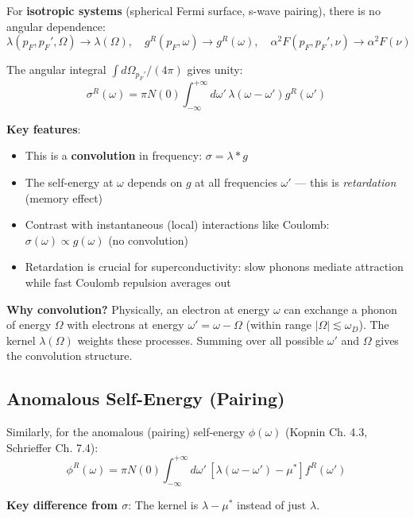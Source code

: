 \documentclass[12pt]{article}
\begin{document}
For \textbf{isotropic systems} (spherical Fermi surface, s-wave pairing), there is no angular dependence:
\begin{equation}
\lambda(p_F, p_F', \Omega) \to \lambda(\Omega), \quad g^R(p_F, \omega) \to g^R(\omega), \quad \alpha^2F(p_F, p_F', \nu) \to \alpha^2F(\nu)
\end{equation}

The angular integral $\int d\Omega_{p_F'}/(4\pi)$ gives unity:
\begin{equation}
\boxed{
\sigma^R(\omega) = \pi N(0) \int_{-\infty}^{+\infty} d\omega' \, \lambda(\omega - \omega') g^R(\omega')
}
\end{equation}

\textbf{Key features}:
\begin{itemize}
\item This is a \textbf{convolution} in frequency: $\sigma = \lambda * g$
\item The self-energy at $\omega$ depends on $g$ at all frequencies $\omega'$ — this is \textit{retardation} (memory effect)
\item Contrast with instantaneous (local) interactions like Coulomb: $\sigma(\omega) \propto g(\omega)$ (no convolution)
\item Retardation is crucial for superconductivity: slow phonons mediate attraction while fast Coulomb repulsion averages out
\end{itemize}

\textbf{Why convolution?} Physically, an electron at energy $\omega$ can exchange a phonon of energy $\Omega$ with electrons at energy $\omega' = \omega - \Omega$ (within range $|\Omega| \lesssim \omega_D$). The kernel $\lambda(\Omega)$ weights these processes. Summing over all possible $\omega'$ and $\Omega$ gives the convolution structure.

\subsection{Anomalous Self-Energy (Pairing)}

Similarly, for the anomalous (pairing) self-energy $\phi(\omega)$ (Kopnin Ch. 4.3, Schrieffer Ch. 7.4):
\begin{equation}
\boxed{
\phi^R(\omega) = \pi N(0) \int_{-\infty}^{+\infty} d\omega' \, [\lambda(\omega - \omega') - \mu^*] f^R(\omega')
}
\end{equation}

\textbf{Key difference from $\sigma$}: The kernel is $\lambda - \mu^*$ instead of just $\lambda$.
\end{document}
